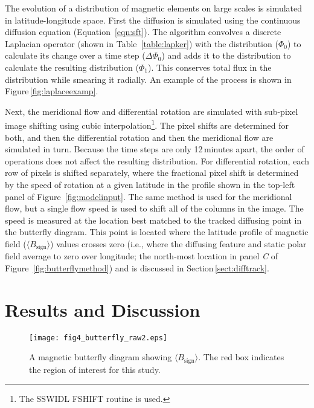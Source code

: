 The evolution of a distribution of magnetic elements on large scales is simulated in latitude-longitude space. First the diffusion is simulated using the continuous diffusion equation (Equation~\ref{eqn:sft}). The algorithm convolves a discrete Laplacian operator (shown in Table~\ref{table:lapker}) with the distribution ($\Phi_0$) to calculate its change over a time step ($\Delta \Phi_0$) and adds it to the distribution to calculate the resulting distribution ($\Phi_1$). This conserves total flux in the distribution while smearing it radially. An example of the process is shown in Figure\,\ref{fig:laplaceexamp}.

Next, the meridional flow and differential rotation are simulated with sub-pixel image shifting using cubic interpolation\footnote{The SSWIDL {FSHIFT} routine is used.}. The pixel shifts are determined for both, and then the differential rotation and then the meridional flow are simulated in turn. Because the time steps are only 12\,minutes apart, the order of operations does not affect the resulting distribution.
For differential rotation, each row of pixels is shifted separately, where the fractional pixel shift is determined by the speed of rotation at a given latitude in the profile shown in the top-left panel of Figure~\ref{fig:modelinput}. The same method is used for the meridional flow, but a single flow speed is used to shift all of the columns in the image. The speed is measured at the location best matched to the tracked diffusing point in the butterfly diagram. This point is located where the latitude profile of magnetic field ($\langle B_\mathrm{sign} \rangle$) values crosses zero (i.e., where the diffusing feature and static polar field average to zero over longitude; the north-most location in panel \emph{C} of Figure~\ref{fig:butterflymethod}) and is discussed in Section\,\ref{sect:difftrack}. 


\section{Results and Discussion}\label{sect:resdisc}

 \begin{figure}[!t]    %
   \centerline{\texttt{[image: fig4\_butterfly\_raw2.eps]}
              }
              \caption[A magnetic butterfly diagram showing $\langle B_{\mathrm{sign}} \rangle$.]{A magnetic butterfly diagram showing $\langle B_{\mathrm{sign}} \rangle$. The red box indicates the region of interest for this study.}
   \label{fig:butterfly_raw}
   \end{figure}


